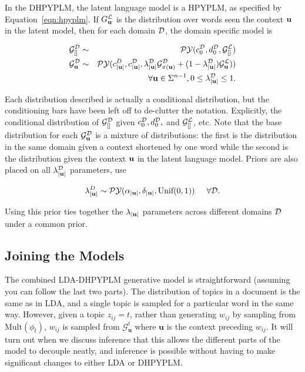In the DHPYPLM, the latent language model is a HPYPLM, as specified by Equation~\ref{eqn:hpyplm}.  If $G^\LA_\bu$ is the distribution over words seen the context $\bu$ in the latent model, then for each domain $\D$,  the domain specific model is

\begin{eqnarray}
\G^\D_{[]} &\sim& \PY(c^\D_0, d^\D_0,\G^\LA_{[]}) \nonumber \\
\G^\D_\bu &\sim& \PY(c^D_{|\bu|}, c^\D_{|\bu|}, \lambda^\D_{|\bu|}\G^\D_{\pi(\bu)} + (1-\lambda^\D_{|\bu|})\G^\LA_\bu)) \nonumber \\ 
&& \hspace{2cm} \forall \bu \in \Sigma^{n-1}, 0 \leq \lambda^\D_{|\bu|} \leq 1. \nonumber
\end{eqnarray}

Each distribution described is actually a conditional distribution, but the conditioning bars have been left off to de-clutter the notation.  Explicitly, the conditional distribution of $\G^\D_{[]}$ given $c^\D_0, d^\D_0,$ and $\G^\LA_{[]}$, etc.  Note that the base distribution for each $\G^\D_\bu$ is a mixture of distributions: the first is the distribution in the same domain given a context shortened by one word while the second is the distribution given the context $\bu$ in the latent language model. Priors are also placed on all $\lambda^\D_{|\bu|}$ parameters, \cite{wood and teh} use

$$\lambda^D_{|\bu|} \sim \PY(\alpha_{|\bu|}, \delta_{|\bu|}, \textrm{Unif}(0,1))  \hspace{.5cm} \forall \D.$$

Using this prior ties together the $\lambda_{|\bu|}$ parameters across different domains $\D$ under a common prior.

\subsection{Joining the Models}

The combined LDA-DHPYPLM generative model is straightforward (assuming you can follow the last two parts).  The distribution of topics in a document is the same as in LDA, and a single topic is sampled for a particular word in the same way.  However, given a topic $z_{ij} = t$, rather than generating $w_{ij}$ by sampling from Mult$(\phi_t)$, $w_{ij}$ is sampled from $\mathcal{G}^t_{\mathbf{u}}$ where $\mathbf{u}$ is the context preceding $w_{ij}$.  It will turn out when we discuss inference that this allows the different parts of the model to decouple neatly, and inference is possible without having to make significant changes to either LDA or DHPYPLM.
